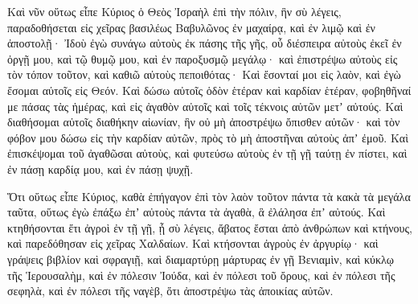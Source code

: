 {\par }{\PP {}Καὶ νῦν οὕτως εἶπε Κύριος ὁ Θεὸς Ἰσραὴλ ἐπὶ τὴν πόλιν, ἣν σὺ λέγεις, παραδοθήσεται εἰς χεῖρας βασιλέως Βαβυλῶνος ἐν μαχαίρᾳ, καὶ ἐν λιμῷ καὶ ἐν ἀποστολῇ·
Ἰδοὺ ἐγὼ συνάγω αὐτοὺς ἐκ πάσης τῆς γῆς, οὗ διέσπειρα αὐτοὺς ἐκεῖ ἐν ὀργῇ μου, καὶ τῷ θυμῷ μου, καὶ ἐν παροξυσμῷ μεγάλῳ· καὶ ἐπιστρέψω αὐτοὺς εἰς τὸν τόπον τοῦτον, καὶ καθιῶ αὐτοὺς πεποιθότας·
Καὶ ἔσονταί μοι εἰς λαὸν, καὶ ἐγὼ ἔσομαι αὐτοῖς εἰς Θεόν.
Καὶ δώσω αὐτοῖς ὁδὸν ἑτέραν καὶ καρδίαν ἑτέραν, φοβηθῆναί με πάσας τὰς ἡμέρας, καὶ εἰς ἀγαθὸν αὐτοῖς καὶ τοῖς τέκνοις αὐτῶν μετʼ αὐτούς.
Καὶ διαθήσομαι αὐτοῖς διαθήκην αἰωνίαν, ἣν οὐ μὴ ἀποστρέψω ὄπισθεν αὐτῶν· καὶ τὸν φόβον μου δώσω εἰς τὴν καρδίαν αὐτῶν, πρὸς τὸ μὴ ἀποστῆναι αὐτοὺς ἀπʼ ἐμοῦ.
Καὶ ἐπισκέψομαι τοῦ ἀγαθῶσαι αὐτοὺς, καὶ φυτεύσω αὐτοὺς ἐν τῇ γῇ ταύτῃ ἐν πίστει, καὶ ἐν πάσῃ καρδίᾳ μου, καὶ ἐν πάσῃ ψυχῇ.
\par }{\PP {}Ὅτι οὕτως εἶπε Κύριος, καθὰ ἐπήγαγον ἐπὶ τὸν λαὸν τοῦτον πάντα τὰ κακὰ τὰ μεγάλα ταῦτα, οὕτως ἐγὼ ἐπάξω ἐπʼ αὐτοὺς πάντα τὰ ἀγαθὰ, ἃ ἐλάλησα ἐπʼ αὐτούς.
Καὶ κτηθήσονται ἔτι ἀγροὶ ἐν τῇ γῇ, ᾗ σὺ λέγεις, ἄβατος ἔσται ἀπὸ ἀνθρώπων καὶ κτήνους, καὶ παρεδόθησαν εἰς χεῖρας Χαλδαίων.
Καὶ κτήσονται ἀγροὺς ἐν ἀργυρίῳ· καὶ γράψεις βιβλίον καὶ σφραγιῇ, καὶ διαμαρτύρῃ μάρτυρας ἐν γῇ Βενιαμὶν, καὶ κύκλῳ τῆς Ἱερουσαλὴμ, καὶ ἐν πόλεσιν Ἰούδα, καὶ ἐν πόλεσι τοῦ ὄρους, καὶ ἐν πόλεσι τῆς σεφηλὰ, καὶ ἐν πόλεσι τῆς ναγὲβ, ὅτι ἀποστρέψω τὰς ἀποικίας αὐτῶν.

}
